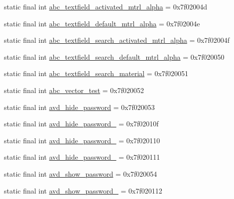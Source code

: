 \begin{CompactItemize}
static final int \hyperlink{classandroid_1_1support_1_1v7_1_1recyclerview_1_1_r_1_1drawable_c120f4ff44297d8d3a93e53975c5d6fc}{abc\_\-textfield\_\-activated\_\-mtrl\_\-alpha} = 0x7f02004d
\item 
static final int \hyperlink{classandroid_1_1support_1_1v7_1_1recyclerview_1_1_r_1_1drawable_b011b2131d9f96ff84e7d2a1fa6d4484}{abc\_\-textfield\_\-default\_\-mtrl\_\-alpha} = 0x7f02004e
\item 
static final int \hyperlink{classandroid_1_1support_1_1v7_1_1recyclerview_1_1_r_1_1drawable_1a9469a14d293f76b69f86c6b26f1ef5}{abc\_\-textfield\_\-search\_\-activated\_\-mtrl\_\-alpha} = 0x7f02004f
\item 
static final int \hyperlink{classandroid_1_1support_1_1v7_1_1recyclerview_1_1_r_1_1drawable_234455a3eda39a734950e26064929b37}{abc\_\-textfield\_\-search\_\-default\_\-mtrl\_\-alpha} = 0x7f020050
\item 
static final int \hyperlink{classandroid_1_1support_1_1v7_1_1recyclerview_1_1_r_1_1drawable_14f322f00cf60bcacb094ceaacede341}{abc\_\-textfield\_\-search\_\-material} = 0x7f020051
\item 
static final int \hyperlink{classandroid_1_1support_1_1v7_1_1recyclerview_1_1_r_1_1drawable_d161d86119d3ffc676017c728268d150}{abc\_\-vector\_\-test} = 0x7f020052
\item 
static final int \hyperlink{classandroid_1_1support_1_1v7_1_1recyclerview_1_1_r_1_1drawable_407e7668559658056db8e9f6ea66c805}{avd\_\-hide\_\-password} = 0x7f020053
\item 
static final int \hyperlink{classandroid_1_1support_1_1v7_1_1recyclerview_1_1_r_1_1drawable_0b23474f11d4b5bf06c98dce8d10e50d}{avd\_\-hide\_\-password\_} = 0x7f02010f
\item 
static final int \hyperlink{classandroid_1_1support_1_1v7_1_1recyclerview_1_1_r_1_1drawable_894de5ff44dc74a592aefe31fe901eaa}{avd\_\-hide\_\-password\_} = 0x7f020110
\item 
static final int \hyperlink{classandroid_1_1support_1_1v7_1_1recyclerview_1_1_r_1_1drawable_771b268266f204df64155e8692bafd52}{avd\_\-hide\_\-password\_} = 0x7f020111
\item 
static final int \hyperlink{classandroid_1_1support_1_1v7_1_1recyclerview_1_1_r_1_1drawable_0bf6789cdb1e8b12ed14f75abbe38b76}{avd\_\-show\_\-password} = 0x7f020054
\item 
static final int \hyperlink{classandroid_1_1support_1_1v7_1_1recyclerview_1_1_r_1_1drawable_13709627806a2c98579af220651a9383}{avd\_\-show\_\-password\_} = 0x7f020112

\end{CompactItemize}
